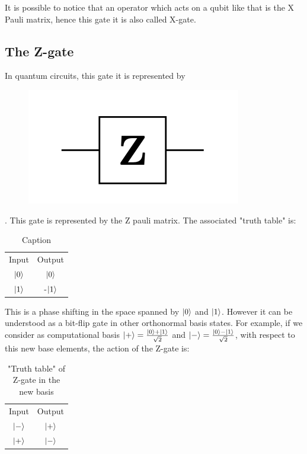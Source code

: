 It is possible to notice that an operator which acts on a qubit like that is the X Pauli matrix, hence this gate it is also called X-gate.

\subsection*{The Z-gate}
In quantum circuits, this gate it is represented by \begin{figure}[H]
\centering
\includegraphics{Mainmatter/images/ZGATE.png}
\end{figure}.
This gate is represented by the Z pauli matrix. The associated "truth table" is: 
\begin{table}[h!]
    \centering
    \begin{tabular}{c|c}
         Input & Output \\
          $\ket{0}$ & $\ket{0}$ \\
          $\ket{1}$ & -$\ket{1}$
    \end{tabular}
    \caption{Caption}
    \label{tab:my_label}
\end{table}


This is a phase shifting in the space spanned by $\ket{0}$ and $\ket{1}$. However it can be understood as a bit-flip gate in other orthonormal basis states. For example, if we consider as computational basis $\ket{+}= \frac{\ket{0} + \ket{1}}{\sqrt{2}}$ and $\ket{-} = \frac{\ket{0} - \ket{1}}{\sqrt{2}}$, with respect to this new base elements, the action of the Z-gate is:
\begin{table}[h!]
    \centering
    \begin{tabular}{c|c}
         Input & Output \\
          $\ket{-}$ & $\ket{+}$ \\
          $\ket{+}$ & $\ket{-}$
    \end{tabular}
    \caption{"Truth table" of Z-gate in the new basis}
    \label{tab:not_gate}
\end{table}



